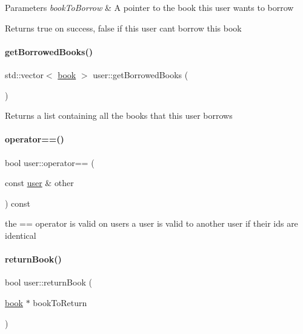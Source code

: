 \begin{DoxyParams}{Parameters}
{\em book\+To\+Borrow} & A pointer to the book this user wants to borrow \\
\hline
\end{DoxyParams}
\begin{DoxyReturn}{Returns}
true on success, false if this user cant borrow this book 
\end{DoxyReturn}
\mbox{\label{classuser_a9e436323a3549a846d342ba313b6bf0e}} 
\paragraph{\texorpdfstring{get\+Borrowed\+Books()}{getBorrowedBooks()}}
{\footnotesize\ttfamily std\+::vector$<$ \hyperlink{classbook}{book} $>$ user\+::get\+Borrowed\+Books (\begin{DoxyParamCaption}{ }\end{DoxyParamCaption})}

\begin{DoxyReturn}{Returns}
a list containing all the books that this user borrows 
\end{DoxyReturn}
\mbox{\label{classuser_aa683f6e1dbaaa382dc62eae8f33e9b08}} 
\paragraph{\texorpdfstring{operator==()}{operator==()}}
{\footnotesize\ttfamily bool user\+::operator== (\begin{DoxyParamCaption}\item[{const \hyperlink{classuser}{user} \&}]{other }\end{DoxyParamCaption}) const\hspace{0.3cm}{\ttfamily [inline]}}

the == operator is valid on users a user is valid to another user if their ids are identical \mbox{\label{classuser_adb88e0898e2024231a9f2852893469ac}} 
\paragraph{\texorpdfstring{return\+Book()}{returnBook()}}
{\footnotesize\ttfamily bool user\+::return\+Book (\begin{DoxyParamCaption}\item[{\hyperlink{classbook}{book} $\ast$}]{book\+To\+Return }\end{DoxyParamCaption})}

